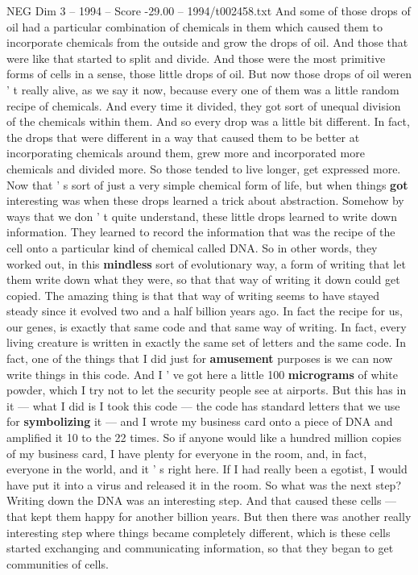 \begin{textsample}{NEG Dim 3 – 1994 – Score -29.00 – 1994/t002458.txt}
And some of those drops of oil had a particular combination of chemicals in them which caused them to incorporate chemicals from the outside and grow the drops of oil.
And those that were like that started to split and divide.
And those were the most primitive forms of cells in a sense, those little drops of oil.
But now those drops of oil weren ' t really alive, as we say it now, because every one of them was a little random recipe of chemicals.
And every time it divided, they got sort of unequal division of the chemicals within them.
And so every drop was a little bit different.
In fact, the drops that were different in a way that caused them to be better at incorporating chemicals around them, grew more and incorporated more chemicals and divided more.
So those tended to live longer, get expressed more.
Now that ' s sort of just a very simple chemical form of life, but when things \textbf{got} interesting was when these drops learned a trick about abstraction.
Somehow by ways that we don ' t quite understand, these little drops learned to write down information.
They learned to record the information that was the recipe of the cell onto a particular kind of chemical called DNA.
So in other words, they worked out, in this \textbf{mindless} sort of evolutionary way, a form of writing that let them write down what they were, so that that way of writing it down could get copied.
The amazing thing is that that way of writing seems to have stayed steady since it evolved two and a half billion years ago.
In fact the recipe for us, our genes, is exactly that same code and that same way of writing.
In fact, every living creature is written in exactly the same set of letters and the same code.
In fact, one of the things that I did just for \textbf{amusement} purposes is we can now write things in this code.
And I ' ve got here a little 100 \textbf{micrograms} of white powder, which I try not to let the security people see at airports.
But this has in it — what I did is I took this code — the code has standard letters that we use for \textbf{symbolizing} it — and I wrote my business card onto a piece of DNA and amplified it 10 to the 22 times.
So if anyone would like a hundred million copies of my business card, I have plenty for everyone in the room, and, in fact, everyone in the world, and it ' s right here.
If I had really been a egotist, I would have put it into a virus and released it in the room.
So what was the next step?
Writing down the DNA was an interesting step.
And that caused these cells — that kept them happy for another billion years.
But then there was another really interesting step where things became completely different, which is these cells started exchanging and communicating information, so that they began to get communities of cells.

\end{textsample}
